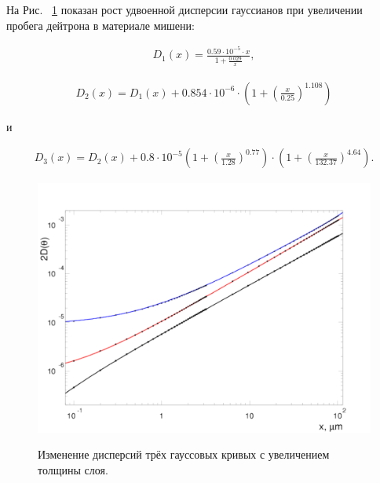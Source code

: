 \documentclass[a4paper,12pt]{article}
\begin{document}
\begin{large}
	На Рис. ~\ref{fig:DispTheta} показан рост удвоенной дисперсии гауссианов при увеличении пробега дейтрона в материале мишени:

\begin{equation}
\label{MSApproximationD1}
\begin{aligned} 
  D_1(x)=\frac{0.59\cdot 10^{-5}\cdot x}{1+\frac{0.029}{x}}, 
\end{aligned}
\end{equation}

\begin{equation}
\label{MSApproximationD2}
\begin{aligned} 
  D_2(x)=D_1(x)+0.854\cdot 10^{-6}\cdot\left( 1+\left(\frac{x}{0.25} \right)^{1.108}\right)
\end{aligned}
\end{equation}

и

\begin{equation}
\label{MSApproximationD3}
\begin{aligned} 
  D_3(x)=D_2(x)+0.8\cdot 10^{-5}\left( 1+\left(\frac{x}{1.28} \right)^{0.77}\right)\cdot\left( 1+ \left(\frac{x}{132.37} \right)^{4.64}\right).
\end{aligned}
\end{equation}

\begin{figure}[ht]
  {
     \includegraphics[width=0.99\linewidth]{images/pars246}
  }
  \caption{Изменение дисперсий трёх гауссовых кривых с увеличением толщины слоя.}
  \label{fig:DispTheta}
\end{figure}


\end{large}
\end{document}
